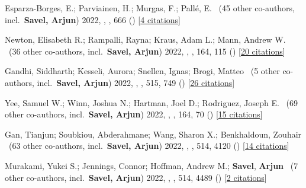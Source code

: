 \item[{\color{numcolor}\scriptsize27}] Esparza-Borges, E.; Parviainen, H.; Murgas, F.; Pall{\'e}, E. \etal\ ({45} other co-authors, incl.\ \textbf{Savel, Arjun}) 2022, , \aanda, {666} () [\href{https://ui.adsabs.harvard.edu/abs/2022A&A...666A..10E}{4 citations}]

\item[{\color{numcolor}\scriptsize26}] Newton, Elisabeth R.; Rampalli, Rayna; Kraus, Adam L.; Mann, Andrew W. \etal\ ({36} other co-authors, incl.\ \textbf{Savel, Arjun}) 2022, , \aj, {164}, 115 () [\href{https://ui.adsabs.harvard.edu/abs/2022AJ....164..115N}{20 citations}]

\item[{\color{numcolor}\scriptsize25}] Gandhi, Siddharth; Kesseli, Aurora; Snellen, Ignas; Brogi, Matteo \etal\ ({5} other co-authors, incl.\ \textbf{Savel, Arjun}) 2022, , \mnras, {515}, 749 () [\href{https://ui.adsabs.harvard.edu/abs/2022MNRAS.515..749G}{26 citations}]

\item[{\color{numcolor}\scriptsize24}] Yee, Samuel W.; Winn, Joshua N.; Hartman, Joel D.; Rodriguez, Joseph E. \etal\ ({69} other co-authors, incl.\ \textbf{Savel, Arjun}) 2022, , \aj, {164}, 70 () [\href{https://ui.adsabs.harvard.edu/abs/2022AJ....164...70Y}{15 citations}]

\item[{\color{numcolor}\scriptsize23}] Gan, Tianjun; Soubkiou, Abderahmane; Wang, Sharon X.; Benkhaldoun, Zouhair \etal\ ({63} other co-authors, incl.\ \textbf{Savel, Arjun}) 2022, , \mnras, {514}, 4120 () [\href{https://ui.adsabs.harvard.edu/abs/2022MNRAS.514.4120G}{14 citations}]

\item[{\color{numcolor}\scriptsize22}] Murakami, Yukei S.; Jennings, Connor; Hoffman, Andrew M.; \textbf{Savel}, \textbf{Arjun} \etal\ ({7} other co-authors, incl.\ \textbf{Savel, Arjun}) 2022, , \mnras, {514}, 4489 () [\href{https://ui.adsabs.harvard.edu/abs/2022MNRAS.514.4489M}{2 citations}]

